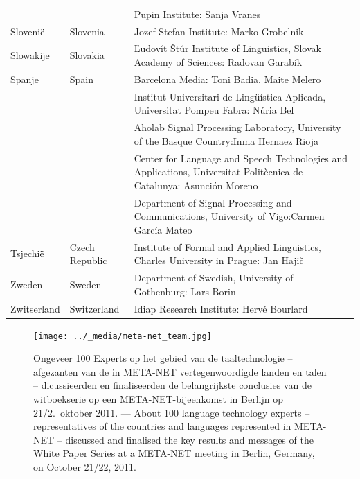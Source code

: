\documentclass[]{../../metanetpaper}
\begin{document}
\begin{longtable}{@{}llp{113mm}@{}}
  & & Pupin Institute: Sanja Vranes \\ \addlinespace
  Sloveni{\"e} & \textcolor{grey1}{Slovenia} & Jozef Stefan Institute: Marko Grobelnik \\ \addlinespace
  Slowakije & \textcolor{grey1}{Slovakia} & Ľudovít Štúr Institute of Linguistics, Slovak Academy of Sciences: Radovan Garabík \\ \addlinespace
  Spanje & \textcolor{grey1}{Spain} & Barcelona Media: Toni Badia, Maite Melero \\ \addlinespace
  & & Institut Universitari de Lingüística Aplicada, Universitat Pompeu Fabra: Núria Bel \\ \addlinespace
  & & Aholab Signal Processing Laboratory, University of the Basque Country:\newline Inma Hernaez Rioja \\ \addlinespace
  & & Center for Language and Speech Technologies and Applications, Universitat Politècnica de Catalunya:  Asunción Moreno \\ \addlinespace
  & & Department of Signal Processing and Communications, University of Vigo:\newline Carmen García Mateo \\ \addlinespace
  Tsjechi{\"e} & \textcolor{grey1}{Czech Republic} & Institute of Formal and Applied Linguistics, Charles University in Prague: Jan Hajič \\ \addlinespace
  
 
  Zweden & \textcolor{grey1}{Sweden} & Department of Swedish, University of Gothenburg: Lars Borin 
  \\ \addlinespace
  Zwitserland & \textcolor{grey1}{Switzerland} & Idiap Research Institute: Hervé Bourlard
\end{longtable}
\normalsize

\renewcommand*{\figureformat}{}
\renewcommand*{\captionformat}{}

\begin{figure}[htbp]
  \center
  \texttt{[image: ../\_media/meta-net\_team.jpg]}
  \caption{Ongeveer 100 Experts op het gebied van de taaltechnologie -- afgezanten van de in META-NET vertegenwoordigde landen en talen  -- dicussieerden en finaliseerden de belangrijkste conclusies van de witboekserie op een META-NET-bijeenkomst in Berlijn op 21/2.~oktober 2011. --- \textcolor{grey1}{About 100 language technology experts -- representatives of the countries and languages represented in META-NET -- discussed and finalised the key results and messages of the White Paper Series at a META-NET meeting in Berlin, Germany, on October 21/22, 2011.}}
  \medskip
\end{figure}
\end{document}
